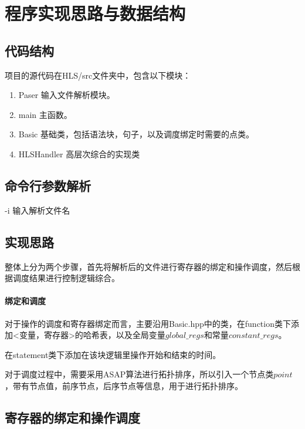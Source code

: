 \documentclass[12pt,hyperref,a4paper,UTF8]{ctexart}
\begin{document}
\section{程序实现思路与数据结构}

\subsection{代码结构}

项目的源代码在HLS/src文件夹中，包含以下模块：

\begin{enumerate}
    \item Paser 输入文件解析模块。
    \item main 主函数。
    \item Basic 基础类，包括语法块，句子，以及调度绑定时需要的点类。
    \item HLSHandler 高层次综合的实现类
\end{enumerate}

\subsection{命令行参数解析}

-i 输入解析文件名

\subsection{实现思路}

整体上分为两个步骤，首先将解析后的文件进行寄存器的绑定和操作调度，然后根据调度结果进行控制逻辑综合。


\paragraph{绑定和调度}

对于操作的调度和寄存器绑定而言，主要沿用Basic.hpp中的类，在function类下添加<变量，寄存器>的哈希表，以及全局变量$global\_regs$和常量$constant\_regs$。

在statement类下添加在该块逻辑里操作开始和结束的时间。

对于调度过程中，需要采用ASAP算法进行拓扑排序，所以引入一个节点类$point$，带有节点值，前序节点，后序节点等信息，用于进行拓扑排序。

\subsection{寄存器的绑定和操作调度}
\end{document}
